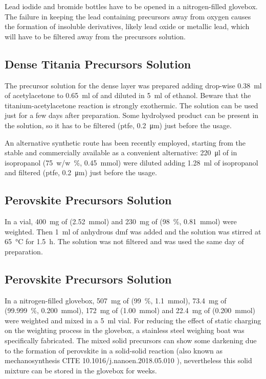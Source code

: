 Lead iodide and bromide bottles have to be opened in a nitrogen-filled glovebox. The failure in keeping the lead containing precursors away from oxygen causes the formation of insoluble derivatives, likely lead oxide or metallic lead, which will have to be filtered away from the precursors solution.

\subsection{Dense Titania Precursors Solution}\label{precursors_tio2}

The precursor solution for the dense \TiOtwo layer was prepared adding drop-wise \SI{0.38}{\ml} of acetylacetone to \SI{0.65}{\ml} of  and diluted in \SI{5}{\ml} of ethanol. Beware that the titanium-acetylacetone reaction is strongly exothermic. The solution can be used just for a few days after preparation. Some hydrolysed product can be present in the solution, so it has to be filtered (\gls{ptfe}, \SI{0.2}{\um}) just before the usage.

An alternative synthetic route has been recently employed, starting from the stable and commercially available  as a convenient alternative: \SI{220}{\ul} of  in isopropanol (\SI{75}{w/w\%}, \SI{0.45}{\mmol}) were diluted adding \SI{1.28}{\ml} of isopropanol and filtered (\gls{ptfe}, \SI{0.2}{\um}) just before the usage.

\subsection{ Perovskite Precursors Solution}\label{precursors_mapicl}

In a vial, \SI{400}{\mg} of  (\SI{2.52}{\mmol}) and \SI{230}{\mg} of \PbCltwo (\SI{98}{\%}, \SI{0.81}{\mmol}) were weighted. Then \SI{1}{\ml} of anhydrous \gls{dmf} was added and the solution was stirred at \SI{65}{\celsius} for \SI{1.5}{\hour}. The solution was not filtered and was used the same day of preparation.

\subsection{ Perovskite Precursors Solution}\label{precursors_csfamapbibr}

In a nitrogen-filled glovebox, \SI{507}{\mg} of \PbItwo (\SI{99}{\%}, \SI{1.1}{\mmol}), \SI{73.4}{\mg} of \PbBrtwo (\SI{99.999}{\%}, \SI{0.200}{\mmol}), \SI{172}{\mg} of  (\SI{1.00}{\mmol}) and \SI{22.4}{\mg} of  (\SI{0.200}{\mmol}) were weighted and mixed in a \SI{5}{\ml} vial. For reducing the effect of static charging on the weighting process in the glovebox, a stainless steel weighing boat was specifically fabricated. The mixed solid precursors can show some darkening due to the formation of perovskite in a solid-solid reaction (also known as mechanosynthesis CITE 10.1016/j.nanoen.2018.05.010 ), nevertheless this solid mixture can be stored in the glovebox for weeks.

